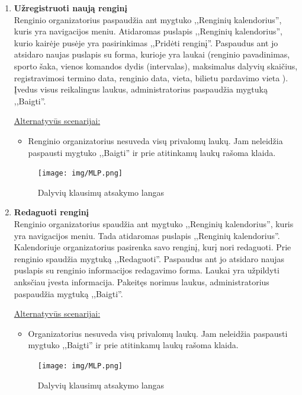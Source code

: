 \documentclass{VUMIFPSkursinis}
\begin{document}
\begin{enumerate} [label = \textbf{U\arabic*.}]
			\item \textbf{Užregistruoti naują renginį}   \\
					Renginio organizatorius paspaudžia ant mygtuko ,,Renginių kalendorius'', kuris yra navigacijos meniu. Atidaromas puslapis ,,Renginių kalendorius'', kurio kairėje pusėje yra pasirinkimas ,,Pridėti renginį''. Paspaudus ant jo atsidaro naujas puslapis su forma, kurioje yra laukai (renginio pavadinimas, sporto šaka, vienos komandos dydis (intervalas), maksimalus dalyvių skaičius, registravimosi termino data, renginio data, vieta, bilietu pardavimo vieta ). Įvedus visus reikalingus laukus, administratorius paspaudžia mygtuką ,,Baigti''.
					
					\underline{Alternatyvūs scenarijai:}
					\begin{itemize}
						\item Renginio organizatorius nesuveda visų privalomų laukų. Jam neleidžia paspausti mygtuko ,,Baigti'' ir prie atitinkamų laukų rašoma klaida.
					\end{itemize}
				
				\begin{figure}[H]
					\centering
					\texttt{[image: img/MLP.png]}
					\caption{Dalyvių klausimų atsakymo langas}
					\label{fig:atsakyti-klausimus}
				\end{figure}	
			
			\item \textbf{Redaguoti renginį}   \\
					Renginio organizatorius spaudžia ant mygtuko ,,Renginių kalendorius'', kuris yra navigacijos meniu. Tada atidaromas puslapis ,,Renginių kalendorius''. Kalendoriuje organizatorius pasirenka savo renginį, kurį nori redaguoti. Prie renginio spaudžia mygtuką ,,Redaguoti''. Paspaudus ant jo atsidaro naujas puslapis su renginio informacijos redagavimo forma. Laukai yra užpildyti anksčiau įvesta informacija. Pakeitęs norimus laukus, administratorius paspaudžia mygtuką ,,Baigti''.
					
					\underline{Alternatyvūs scenarijai:}
					\begin{itemize}
						\item Organizatorius nesuveda visų privalomų laukų. Jam neleidžia paspausti mygtuko ,,Baigti'' ir prie atitinkamų laukų rašoma klaida.
					\end{itemize}
				
				\begin{figure}[H]
					\centering
					\texttt{[image: img/MLP.png]}
					\caption{Dalyvių klausimų atsakymo langas}
					\label{fig:atsakyti-klausimus}
				\end{figure}
			

\end{enumerate}
\end{document}
